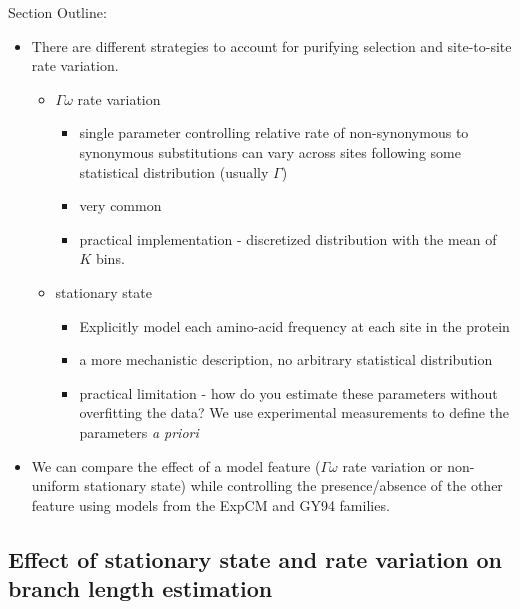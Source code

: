 \documentclass[11pt]{article}
\newcommand\skhcomment[1]{{\color{cyan}#1}}
\begin{document}
\skhcomment{Section Outline:}


\begin{itemize}
\item There are different strategies to account for purifying selection and site-to-site rate variation. 
\begin{itemize}
\item $\Gamma\omega$ rate variation 
\begin{itemize}
\item single parameter controlling relative rate of non-synonymous to synonymous substitutions can vary across sites following some statistical distribution (usually $\Gamma$)
\item very common 
\item practical implementation - discretized distribution with the mean of $K$ bins. 
\end{itemize}
\item stationary state
\begin{itemize}
\item Explicitly model each amino-acid frequency at each site in the protein 
\item a more mechanistic description, no arbitrary statistical distribution 
\item practical limitation - how do you estimate these parameters without overfitting the data? We use experimental measurements to define the parameters \textit{a priori}
\end{itemize}
\end{itemize}
\item We can compare the effect of a model feature ($\Gamma\omega$ rate variation or non-uniform stationary state) while controlling the presence/absence of the other feature using models from the ExpCM and GY94 families. 
\end{itemize}


\subsection*{Effect of stationary state and rate variation on branch length estimation}
\end{document}
